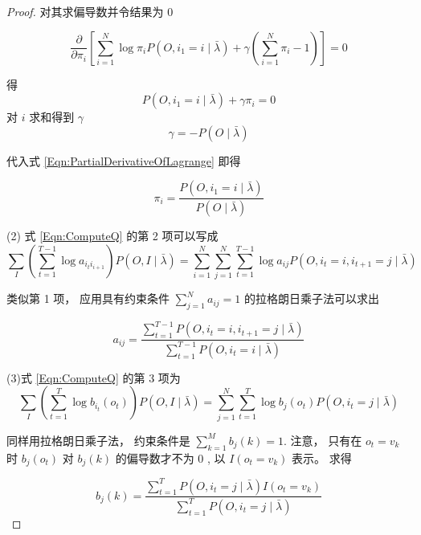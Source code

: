 \begin{proof}
对其求偏导数并令结果为 0


\begin{equation}
    \label{Eqn:PartialDerivativeOfLagrange}
    \frac{\partial}{\partial \pi_{i}}\left[\sum_{i=1}^{N} \log \pi_{i} P\left(O, i_{1}=i \mid \bar{\lambda}\right)+\gamma\left(\sum_{i=1}^{N} \pi_{i}-1\right)\right]=0
\end{equation}


得
\begin{equation}
P\left(O, i_{1}=i \mid \bar{\lambda}\right)+\gamma \pi_{i}=0
\end{equation}
对 $ i $ 求和得到 $ \gamma $
\begin{equation}
\gamma=-P(O \mid \bar{\lambda})
\end{equation}

代入式 \ref{Eqn:PartialDerivativeOfLagrange}  即得

\begin{equation}
    \label{Eqn:ComputePI}
\pi_{i}=\frac{P\left(O, i_{1}=i \mid \bar{\lambda}\right)}{P(O \mid \bar{\lambda})}
\end{equation}



(2) 式 \ref{Eqn:ComputeQ} 的第 2 项可以写成
\begin{equation}
\sum_{I}\left(\sum_{t=1}^{T-1} \log a_{i_t i_{i+1}}\right) P(O, I \mid \bar{\lambda})=\sum_{i=1}^{N} \sum_{j=1}^{N} \sum_{t=1}^{T-1} \log a_{i j} P\left(O, i_{t}=i, i_{t+1}=j \mid \bar{\lambda}\right)
\end{equation}

类似第 1 项， 应用具有约束条件 $ \sum_{j=1}^{N} a_{i j}=1 $ 的拉格朗日乘子法可以求出

\begin{equation}
    \label{Eqn:ComputeA}
a_{i j}=\frac{\sum_{t=1}^{T-1} P\left(O, i_{t}=i, i_{t+1}=j \mid \bar{\lambda}\right)}{\sum_{t=1}^{T-1} P\left(O, i_{t}=i \mid \bar{\lambda}\right)} 
\end{equation}




(3)式 \ref{Eqn:ComputeQ} 的第 3 项为
\begin{equation}
\sum_{I}\left(\sum_{t=1}^{T} \log b_{i_{t}}\left(o_{t}\right)\right) P(O, I \mid \bar{\lambda})=\sum_{j=1}^{N} \sum_{t=1}^{T} \log b_{j}\left(o_{t}\right) P\left(O, i_{t}=j \mid \bar{\lambda}\right)
\end{equation}

同样用拉格朗日乘子法， 约束条件是 $ \sum_{k=1}^{M} b_{j}(k)=1 $. 注意， 只有在 $ o_{t}=v_{k} $ 时 $ b_{j}\left(o_{t}\right) $ 对 $ b_{j}(k) $ 的偏导数才不为 0 , 以 $ I\left(o_{t}=v_{k}\right) $ 表示。 求得

\begin{equation}
    \label{Eqn:ComputeB}
 b_{j}(k)=\frac{\sum_{t=1}^{T} P\left(O, i_{t}=j \mid \bar{\lambda}\right) I\left(o_{t}=v_{k}\right)}{\sum_{t=1}^{T} P\left(O, i_{t}=j \mid \bar{\lambda}\right)}
\end{equation}
 

\end{proof}



